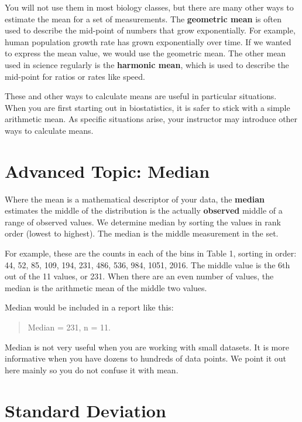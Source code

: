 \documentclass[
]{book}
\begin{document}
You will not use them in most biology classes, but there are many other ways to estimate the mean for a set of measurements. The \textbf{geometric mean} is often used to describe the mid-point of numbers that grow exponentially. For example, human population growth rate has grown exponentially over time. If we wanted to express the mean value, we would use the geometric mean. The other mean used in science regularly is the \textbf{harmonic mean}, which is used to describe the mid-point for ratios or rates like speed.

These and other ways to calculate means are useful in particular situations. When you are first starting out in biostatistics, it is safer to stick with a simple arithmetic mean. As specific situations arise, your instructor may introduce other ways to calculate means.

\hypertarget{advanced-topic-median}{%
\section{Advanced Topic: Median}\label{advanced-topic-median}}

Where the mean is a mathematical descriptor of your data, the \textbf{median} estimates the middle of the distribution is the actually \textbf{observed} middle of a range of observed values. We determine median by sorting the values in rank order (lowest to highest). The median is the middle measurement in the set.

For example, these are the counts in each of the bins in Table 1, sorting in order: 44, 52, 85, 109, 194, 231, 486, 536, 984, 1051, 2016. The middle value is the 6th out of the 11 values, or 231. When there are an even number of values, the median is the arithmetic mean of the middle two values.

Median would be included in a report like this:

\begin{quote}
Median = 231, n = 11.
\end{quote}

Median is not very useful when you are working with small datasets. It is more informative when you have dozens to hundreds of data points. We point it out here mainly so you do not confuse it with mean.

\hypertarget{standard-deviation}{%
\section{Standard Deviation}\label{standard-deviation}}
\end{document}
